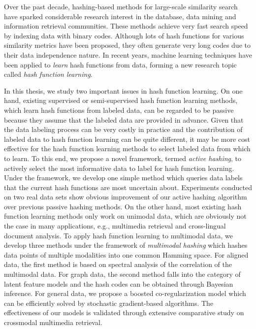 


Over the past decade, hashing-based methods for large-scale similarity search have sparked considerable research interest in the database, data mining and information retrieval communities. These methods achieve very fast search speed by indexing data with binary codes. Although lots of hash functions for various similarity metrics have been proposed, they often generate very long codes due to their data independence nature. In recent years, machine learning techniques have been applied to \textit{learn} hash functions from data, forming a new research topic called \textit{hash function learning}. 

In this thesis, we study two important issues in hash function learning. On one hand, existing supervised or semi-supervised hash function learning methods, which learn hash functions from labeled data, can be regarded to be passive because they assume that the labeled data are provided in advance. Given that the data labeling process can be very costly in practice and the contribution of labeled data to hash function learning can be quite different, it may be more cost effective for the hash function learning methods to select labeled data from which to learn. To this end, we propose a novel framework, termed \textit{active hashing}, to actively select the most informative data to label for hash function learning. Under the framework, we develop one simple method which queries data labels that the current hash functions are most uncertain about. Experiments conducted on two real data sets show obvious improvement of our active hashing algorithm over previous passive hashing methods. On the other hand, most existing hash function learning methods only work on unimodal data, which are obviously not the case in many applications, e.g., multimedia retrieval and cross-lingual document analysis. To apply hash function learning to multimodal data, we develop three methods under the framework of \textit{multimodal hashing} which hashes data points of multiple modalities into one common Hamming space. For aligned data, the first method is based on spectral analysis of the correlation of the multimodal data. For graph data, the second method falls into the category of latent feature models and the hash codes can be obtained through Bayesian inference. For general data, we propose a boosted co-regularization model which can be efficiently solved by stochastic gradient-based algorithms. The effectiveness of our models is validated through extensive comparative study on crossmodal multimedia retrieval.

